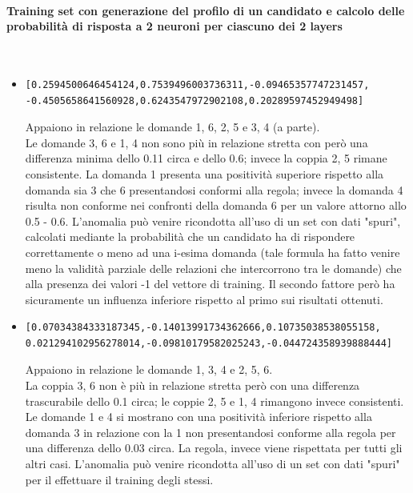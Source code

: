 \paragraph{Training set con generazione del profilo di un candidato e calcolo delle probabilit\`a di risposta a 2 neuroni per ciascuno dei 2 layers}\mbox{}
\label{Training set con generazione del profilo di un candidato e calcolo delle probabilita di risposta a 2 neuroni per ciascuno dei 2 layers}
\\
\noindent
\begin{itemize}
\item  \begin{verbatim}[0.2594500646454124,0.7539496003736311,-0.09465357747231457,
-0.4505658641560928,0.6243547972902108,0.20289597452949498]\end{verbatim}
Appaiono in relazione le domande 1, 6, 2, 5 e 3, 4 (a parte).\\
Le domande 3, 6 e 1, 4 non sono pi\`u in relazione stretta con per\`o una differenza minima dello 0.11 circa e dello 0.6; invece la coppia 2, 5 rimane consistente. La domanda 1 presenta una positivit\`a superiore rispetto alla domanda sia 3 che 6 presentandosi conformi alla regola; invece la domanda 4 risulta non conforme nei confronti della domanda 6 per un valore attorno allo 0.5 - 0.6. L'anomalia pu\`o venire ricondotta all'uso di un set con dati "spuri", calcolati mediante la probabilit\`a che un candidato ha di rispondere correttamente o meno ad una i-esima domanda (tale formula ha fatto venire meno la validit\`a parziale delle relazioni che intercorrono tra le domande) che alla presenza dei valori -1 del vettore di training. Il secondo fattore per\`o ha sicuramente un influenza inferiore rispetto al primo sui risultati ottenuti.

\item  \begin{verbatim}[0.07034384333187345,-0.14013991734362666,0.10735038538055158,
0.021294102956278014,-0.09810179582025243,-0.044724358939888444]\end{verbatim}
Appaiono in relazione le domande 1, 3, 4 e 2, 5, 6.\\
La coppia 3, 6 non \`e pi\`u in relazione stretta per\`o con una differenza trascurabile dello 0.1 circa; le coppie 2, 5 e 1, 4 rimangono invece consistenti. Le domande 1 e 4 si mostrano con una positivit\`a inferiore rispetto alla domanda 3 in relazione con la 1 non presentandosi conforme alla regola per una differenza dello 0.03 circa. La regola, invece viene rispettata per tutti gli altri casi. L'anomalia pu\`o venire ricondotta all'uso di un set con dati "spuri" per il effettuare il training degli stessi.


\end{itemize}

